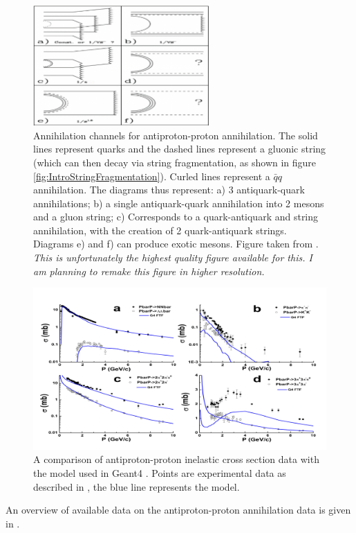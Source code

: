 \begin{figure}
    \centering
    \includegraphics[width=0.6\textwidth]{figures/pbar_p_annihilation_channels.png}
    \caption{Annihilation channels for antiproton-proton annihilation. The solid lines represent quarks and the dashed lines represent a gluonic string (which can then decay via string fragmentation, as shown in figure \ref{fig:IntroStringFragmentation}). Curled lines represent a $\bar{q}q$ annihilation. The diagrams thus represent: a) 3 antiquark-quark annihilations; b) a single antiquark-quark annihilation into 2 mesons and a gluon string; c) Corresponds to a quark-antiquark and string annihilation, with the creation of 2 quark-antiquark strings. Diagrams e) and f) can produce exotic mesons. Figure taken from \cite{antiproton_dynamics_2}. \textit{This is unfortunately the highest quality figure available for this. I am planning to remake this figure in higher resolution.}}
    \label{fig:antiproton_annihilation_channels}
\end{figure}
\begin{figure}[h!]
    \centering
    \includegraphics[width=\textwidth]{figures/Geant4_pbar_inel.png}
    \caption{A comparison of antiproton-proton inelastic cross section data with the model used in Geant4 \cite{antiproton_dynamics_CERN}. Points are experimental data as described in \cite{pbar_data}, the blue line represents the model.}
    \label{fig:pbar_p_xs_data_comp}
\end{figure}
An overview of available data on the antiproton-proton annihilation data is given in \cite{hidden_Strangeness, antiproton_physics_data, pbar_data}.



